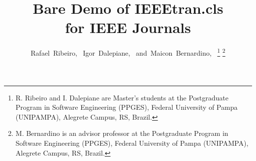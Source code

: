 \documentclass[journal]{IEEEtran}
\begin{document}
%
\title{Bare Demo of IEEEtran.cls\\ for IEEE Journals}
%
%
%

\author{Rafael~Ribeiro,~
        Igor~Dalepiane,~
        and~Maicon~Bernardino,~%
\thanks{R. Ribeiro and I. Dalepiane are Master's students at the Postgraduate Program in Software Engineering (PPGES),
Federal University of Pampa (UNIPAMPA), Alegrete Campus, RS, Brazil.}%
\thanks{M. Bernardino is an advisor professor at the Postgraduate Program in Software Engineering (PPGES),
Federal University of Pampa (UNIPAMPA), Alegrete Campus, RS, Brazil.}}

%
%
\end{document}
